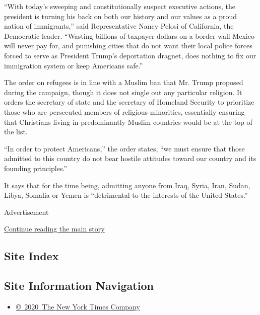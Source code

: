 ``With today's sweeping and constitutionally suspect executive actions,
the president is turning his back on both our history and our values as
a proud nation of immigrants,'' said Representative Nancy Pelosi of
California, the Democratic leader. ``Wasting billions of taxpayer
dollars on a border wall Mexico will never pay for, and punishing cities
that do not want their local police forces forced to serve as President
Trump's deportation dragnet, does nothing to fix our immigration system
or keep Americans safe.''

The order on refugees is in line with a Muslim ban that Mr. Trump
proposed during the campaign, though it does not single out any
particular religion. It orders the secretary of state and the secretary
of Homeland Security to prioritize those who are persecuted members of
religious minorities, essentially ensuring that Christians living in
predominantly Muslim countries would be at the top of the list.

``In order to protect Americans,'' the order states, ``we must ensure
that those admitted to this country do not bear hostile attitudes toward
our country and its founding principles.''

It says that for the time being, admitting anyone from Iraq, Syria,
Iran, Sudan, Libya, Somalia or Yemen is ``detrimental to the interests
of the United States.''

Advertisement

\protect\hyperlink{after-bottom}{Continue reading the main story}

\hypertarget{site-index}{%
\subsection{Site Index}\label{site-index}}

\hypertarget{site-information-navigation}{%
\subsection{Site Information
Navigation}\label{site-information-navigation}}

\begin{itemize}
\tightlist
\item
  \href{https://help.nytimes3xbfgragh.onion/hc/en-us/articles/115014792127-Copyright-notice}{©~2020~The
  New York Times Company}
\end{itemize}

